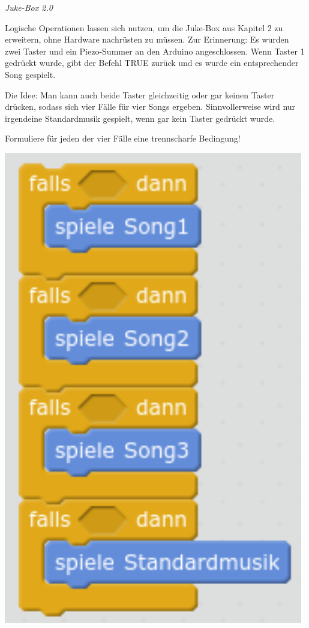 \begin{minipage}{0.75\textwidth}
	\begin{aufgabe} \emph{Juke-Box 2.0}
			
		Logische Operationen lassen sich nutzen, um die Juke-Box aus Kapitel 2 zu erweitern, ohne Hardware nachrüsten zu müssen. Zur Erinnerung: Es wurden zwei Taster und ein Piezo-Summer an den Arduino angeschlossen. Wenn Taster 1 gedrückt wurde, gibt der Befehl  TRUE zurück und es wurde ein entsprechender Song gespielt.
		
		Die Idee: Man kann auch beide Taster gleichzeitig oder gar keinen Taster drücken, sodass sich vier Fälle für vier Songs ergeben. Sinnvollerweise wird nur irgendeine Standardmusik gespielt, wenn gar kein Taster gedrückt wurde.
		
		Formuliere für jeden der vier Fälle eine trennscharfe Bedingung!
	\end{aufgabe}
\end{minipage}
\hfill
\begin{minipage}{0.23\textwidth}
	\centering
	\includegraphics[width=0.98\textwidth]{./pics/jukebox2-0-leer.png}
\end{minipage}
